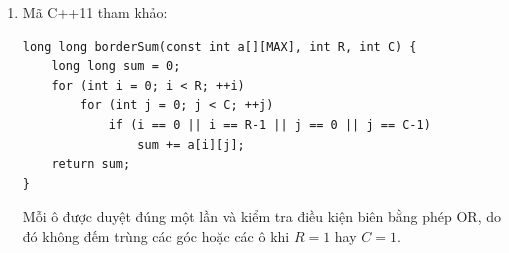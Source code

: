 \documentclass[11pt,a4paper]{article}
\begin{document}
\begin{enumerate}
\begin{minipage}[t]{\linewidth}
\end{minipage}
\item \begin{minipage}[t]{\linewidth}
Mã C++11 tham khảo:
\begin{lstlisting}
long long borderSum(const int a[][MAX], int R, int C) {
    long long sum = 0;
    for (int i = 0; i < R; ++i)
        for (int j = 0; j < C; ++j)
            if (i == 0 || i == R-1 || j == 0 || j == C-1)
                sum += a[i][j];
    return sum;
}
\end{lstlisting}
Mỗi ô được duyệt đúng một lần và kiểm tra điều kiện biên bằng phép OR, do đó không đếm trùng các góc hoặc các ô khi $R=1$ hay $C=1$.
\end{minipage}
\end{enumerate}
\end{document}
